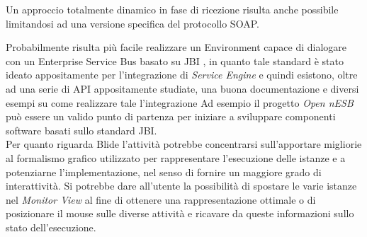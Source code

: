 Un approccio totalmente dinamico in fase di ricezione risulta anche possibile
limitandosi ad una versione specifica del protocollo SOAP.

Probabilmente risulta più facile realizzare un Environment capace di dialogare
con un Enterprise Service Bus basato su JBI \cite{JBI}, in quanto tale standard
è stato ideato appositamente per l'integrazione di \emph{Service Engine} e quindi
esistono, oltre ad una serie di API appositamente studiate, una buona
documentazione e diversi esempi su come realizzare tale l'integrazione
Ad esempio il progetto \emph{Open nESB} \cite{OPENESB} può essere un valido
punto di partenza per iniziare a sviluppare componenti software basati sullo
standard JBI.
\\

Per quanto riguarda Blide l'attività potrebbe concentrarsi sull'apportare
migliorie al formalismo grafico utilizzato per rappresentare l'esecuzione delle
istanze e a potenziarne l'implementazione, nel senso di fornire un maggiore
grado di interattività. Si potrebbe dare all'utente la possibilità di spostare
le varie istanze nel \emph{Monitor View} al fine di ottenere una
rappresentazione ottimale o di posizionare il mouse sulle diverse attività e
ricavare da queste informazioni sullo stato dell'esecuzione.





